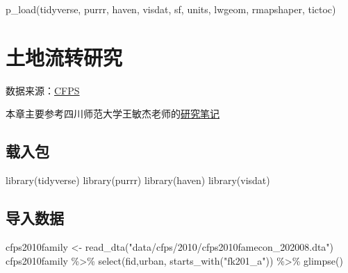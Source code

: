 \documentclass[
  oneside]{book}
\newenvironment{Shaded}{\begin{snugshade}}{\end{snugshade}}
\newcommand{\FunctionTok}[1]{\textcolor[rgb]{0.00,0.00,0.00}{#1}}
\newcommand{\NormalTok}[1]{#1}
\newcommand{\OtherTok}[1]{\textcolor[rgb]{0.56,0.35,0.01}{#1}}
\newcommand{\SpecialCharTok}[1]{\textcolor[rgb]{0.00,0.00,0.00}{#1}}
\newcommand{\StringTok}[1]{\textcolor[rgb]{0.31,0.60,0.02}{#1}}
\begin{document}
\begin{Shaded}
\begin{Highlighting}[]
\FunctionTok{p\_load}\NormalTok{(tidyverse,}
\NormalTok{       purrr,}
\NormalTok{       haven,}
\NormalTok{       visdat,}
\NormalTok{       sf,}
\NormalTok{       units,}
\NormalTok{       lwgeom,}
\NormalTok{       rmapshaper,}
\NormalTok{       tictoc)}
\end{Highlighting}
\end{Shaded}

\hypertarget{ux571fux5730ux6d41ux8f6cux7814ux7a76}{%
\chapter{土地流转研究}\label{ux571fux5730ux6d41ux8f6cux7814ux7a76}}

数据来源：\href{http://www.isss.pku.edu.cn/cfps/index.htm}{CFPS}

本章主要参考四川师范大学王敏杰老师的\href{https://bookdown.org/wangminjie/R4cfps/land.html}{研究笔记}

\hypertarget{ux8f7dux5165ux5305}{%
\section{载入包}\label{ux8f7dux5165ux5305}}

\begin{Shaded}
\begin{Highlighting}[]
\FunctionTok{library}\NormalTok{(tidyverse)}
\FunctionTok{library}\NormalTok{(purrr)}
\FunctionTok{library}\NormalTok{(haven)}
\FunctionTok{library}\NormalTok{(visdat)}
\end{Highlighting}
\end{Shaded}

\hypertarget{ux5bfcux5165ux6570ux636e}{%
\section{导入数据}\label{ux5bfcux5165ux6570ux636e}}

\begin{Shaded}
\begin{Highlighting}[]
\NormalTok{cfps2010family }\OtherTok{\textless{}{-}} \FunctionTok{read\_dta}\NormalTok{(}\StringTok{"data/cfps/2010/cfps2010famecon\_202008.dta"}\NormalTok{)}
\NormalTok{cfps2010family }\SpecialCharTok{\%\textgreater{}\%}
  \FunctionTok{select}\NormalTok{(fid,urban, }\FunctionTok{starts\_with}\NormalTok{(}\StringTok{"fk201\_a"}\NormalTok{)) }\SpecialCharTok{\%\textgreater{}\%}
  \FunctionTok{glimpse}\NormalTok{()}
\end{Highlighting}
\end{Shaded}
\end{document}
